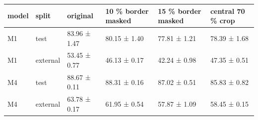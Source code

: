 \begin{tabular}{llllll}
\toprule
model & split & original & 10 \% border masked & 15 \% border masked & central 70 \% crop \\
\midrule
M1 & test & 83.96 ± 1.47 & 80.15 ± 1.40 & 77.81 ± 1.21 & 78.39 ± 1.68 \\
M1 & external & 53.45 ± 0.77 & 46.13 ± 0.17 & 42.24 ± 0.98 & 47.35 ± 0.51 \\
M4 & test & 88.67 ± 0.11 & 88.31 ± 0.16 & 87.02 ± 0.51 & 85.83 ± 0.82 \\
M4 & external & 63.78 ± 0.17 & 61.95 ± 0.54 & 57.87 ± 1.09 & 58.45 ± 0.15 \\
\bottomrule
\end{tabular}
